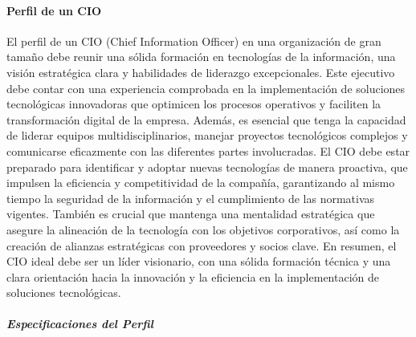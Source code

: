     \paragraph{Perfil de un CIO}
    El perfil de un CIO (Chief Information Officer) en una organización de gran tamaño debe reunir una sólida formación en tecnologías de la información, una visión estratégica clara y habilidades de liderazgo excepcionales. Este ejecutivo debe contar con una experiencia comprobada en la implementación de soluciones tecnológicas innovadoras que optimicen los procesos operativos y faciliten la transformación digital de la empresa. Además, es esencial que tenga la capacidad de liderar equipos multidisciplinarios, manejar proyectos tecnológicos complejos y comunicarse eficazmente con las diferentes partes involucradas. 
    El CIO debe estar preparado para identificar y adoptar nuevas tecnologías de manera proactiva, que impulsen la eficiencia y competitividad de la compañía, garantizando al mismo tiempo la seguridad de la información y el cumplimiento de las normativas vigentes. También es crucial que mantenga una mentalidad estratégica que asegure la alineación de la tecnología con los objetivos corporativos, así como la creación de alianzas estratégicas con proveedores y socios clave. En resumen, el CIO ideal debe ser un líder visionario, con una sólida formación técnica y una clara orientación hacia la innovación y la eficiencia en la implementación de soluciones tecnológicas. 
        \subparagraph*{Especificaciones del Perfil }
